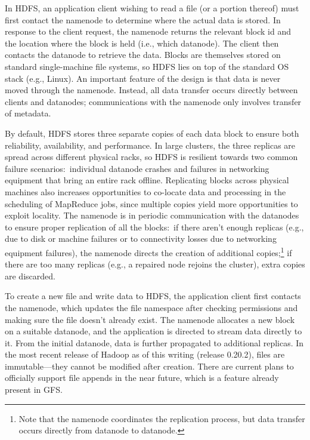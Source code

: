 In HDFS, an application client wishing to read a file (or a portion
thereof) must first contact the namenode to determine where the actual
data is stored.  In response to the client request, the namenode
returns the relevant block id and the location where the block is held
(i.e., which datanode).  The client then contacts the datanode to
retrieve the data.  Blocks are themselves stored on standard
single-machine file systems, so HDFS lies on top of the standard OS
stack (e.g., Linux).  An important feature of the design is that data
is never moved through the namenode.  Instead, all data transfer
occurs directly between clients and datanodes; communications with the
namenode only involves transfer of metadata.

By default, HDFS stores three separate copies of each data block to
ensure both reliability, availability, and performance.  In large
clusters, the three replicas are spread across different physical
racks, so HDFS is resilient towards two common failure scenarios:\
individual datanode crashes and failures in networking equipment that
bring an entire rack offline.  Replicating blocks across physical
machines also increases opportunities to co-locate data and processing
in the scheduling of MapReduce jobs, since multiple copies yield more
opportunities to exploit locality.  The namenode is in periodic
communication with the datanodes to ensure proper replication of all
the blocks:\ if there aren't enough replicas (e.g., due to disk or
machine failures or to connectivity losses due to networking equipment
failures), the namenode directs the creation of additional
copies;\footnote{Note that the namenode coordinates the replication
process, but data transfer occurs directly from datanode to datanode.}
if there are too many replicas (e.g., a repaired node rejoins the
cluster), extra copies are discarded.

To create a new file and write data to HDFS, the application client
first contacts the namenode, which updates the file namespace after
checking permissions and making sure the file doesn't already exist.
The namenode allocates a new block on a suitable datanode, and the
application is directed to stream data directly to it.  From the
initial datanode, data is further propagated to additional replicas.
In the most recent release of Hadoop as of this writing (release
0.20.2), files are immutable---they cannot be modified after creation.
There are current plans to officially support file appends in the near
future, which is a feature already present in GFS.

